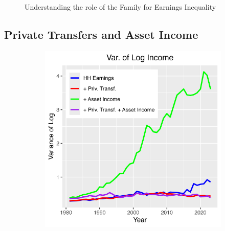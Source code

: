 \documentclass{article}
\begin{document}
\begin{figure}
\begin{subfigure}[t]{0.475\textwidth}
        \label{fig:Indi_to_HH_correlation}
    \end{subfigure}
    \caption{Understanding the role of the Family for Earnings Inequality}
    \label{fig:Indi_to_HH}
\end{figure}

\subsection{Private Transfers and Asset Income}

\begin{figure}
    \centering
    \begin{subfigure}[t]{0.475\textwidth}
        \centering
        \includegraphics[width=\textwidth]{figures/Fig_4/Fig_4a_Var_inc.png}
        \label{fig:Trans_Asset_Var1}
    \end{subfigure}
    \begin{subfigure}[t]{0.475\textwidth}
        \centering

\end{subfigure}
\end{figure}
\end{document}
